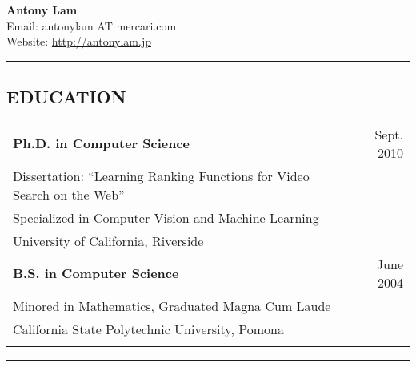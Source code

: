 \documentclass[letterpaper,10pt]{article}
\def\name{Antony Lam}
\newcommand{\myline}{ \rule{\textwidth}{0.01in} }
\renewcommand{\bf}{\bfseries}
\begin{document}
{\huge\bf\name} \\
Email: antonylam AT mercari.com\\
Website: \url{http://antonylam.jp}  \\
\myline

\subsection*{EDUCATION}
\begin{tabularx}{\textwidth}{b{}r}
        \bf{Ph.D. in Computer Science} & Sept. 2010 {} \\
                                Dissertation: ``Learning Ranking Functions for Video Search on the Web'' {} \\
        Specialized in Computer Vision and Machine Learning \\
        University of California, Riverside& {} \\  \vspace{0.1in}
        \bf{B.S. in Computer Science} &  June 2004  {} \\
        Minored in Mathematics, Graduated Magna Cum Laude & {} \\
        California State Polytechnic University, Pomona& {} \\  \vspace{0.1in}  
\end{tabularx}
\myline


\end{document}

